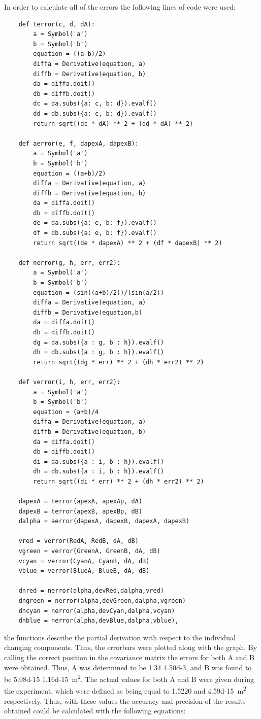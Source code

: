 \documentclass[12pt, a4paper]{article}
\begin{document}
In order to calculate all of the errors the following lines of code were used:
\begin{verbatim}
    def terror(c, d, dA):
        a = Symbol('a')
        b = Symbol('b')
        equation = ((a-b)/2)
        diffa = Derivative(equation, a)
        diffb = Derivative(equation, b)
        da = diffa.doit()
        db = diffb.doit()
        dc = da.subs({a: c, b: d}).evalf()
        dd = db.subs({a: c, b: d}).evalf()
        return sqrt((dc * dA) ** 2 + (dd * dA) ** 2)

    def aerror(e, f, dapexA, dapexB):
        a = Symbol('a')
        b = Symbol('b')
        equation = ((a+b)/2)
        diffa = Derivative(equation, a)
        diffb = Derivative(equation, b)
        da = diffa.doit()
        db = diffb.doit()
        de = da.subs({a: e, b: f}).evalf()
        df = db.subs({a: e, b: f}).evalf()
        return sqrt((de * dapexA) ** 2 + (df * dapexB) ** 2)

    def nerror(g, h, err, err2):
        a = Symbol('a')
        b = Symbol('b')
        equation = (sin((a+b)/2))/(sin(a/2))
        diffa = Derivative(equation, a)
        diffb = Derivative(equation,b)
        da = diffa.doit()
        db = diffb.doit()
        dg = da.subs({a : g, b : h}).evalf()
        dh = db.subs({a : g, b : h}).evalf()
        return sqrt((dg * err) ** 2 + (dh * err2) ** 2)

    def verror(i, h, err, err2):
        a = Symbol('a')
        b = Symbol('b')
        equation = (a+b)/4
        diffa = Derivative(equation, a)
        diffb = Derivative(equation, b)
        da = diffa.doit()
        db = diffb.doit()
        di = da.subs({a : i, b : h}).evalf()
        dh = db.subs({a : i, b : h}).evalf()
        return sqrt((di * err) ** 2 + (dh * err2) ** 2) 
    
    dapexA = terror(apexA, apexAp, dA)
    dapexB = terror(apexB, apexBp, dB)
    dalpha = aerror(dapexA, dapexB, dapexA, dapexB)

    vred = verror(RedA, RedB, dA, dB)
    vgreen = verror(GreenA, GreenB, dA, dB)
    vcyan = verror(CyanA, CyanB, dA, dB)
    vblue = verror(BlueA, BlueB, dA, dB)

    dnred = nerror(alpha,devRed,dalpha,vred)
    dngreen = nerror(alpha,devGreen,dalpha,vgreen)
    dncyan = nerror(alpha,devCyan,dalpha,vcyan)
    dnblue = nerror(alpha,devBlue,dalpha,vblue),
\end{verbatim}
the functions describe the partial derivation with respect to the individual changing components. Thus, the errorbars were plotted along with the graph. By calling the correct position in the covariance matrix the errors for both A and B were obtained. Thus, A was determined to be \num{1.34} \textpm \num{4.50d-3}, and B was found to be \num{5.08d-15} \textpm \qty{1.16d-15}{\metre\squared}. The actual values for both A and B were given during the experiment, which were defined as being equal to \num{1.5220} and \qty{4.59d-15}{\metre\squared} respectively. Thus, with these values the accuracy and precision of the results obtained could be calculated with the following equations:
\end{document}
